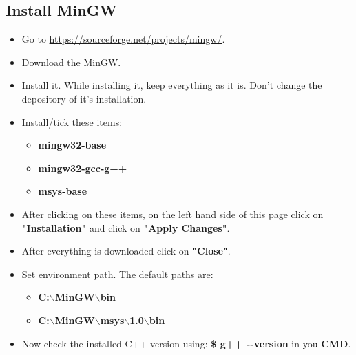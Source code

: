 \documentclass[12pt , a4paper]{article}
\newcommand{\hl}[1]{\colorbox{coolblack}{\color{cream}\textbf{#1}\color{black}}}
\begin{document}
	\subsection{Install MinGW}
		\begin{itemize}
			\item Go to \href{https://sourceforge.net/projects/mingw/}{https://sourceforge.net/projects/mingw/}. \\
			\item Download the MinGW. \\
			\item Install it. While installing it, keep everything as it is. Don't change the depository of it's installation.\\
			\item Install/tick these items:\\
				\begin{itemize}
					\item \hl{mingw32-base} \\
					\item \hl{mingw32-gcc-g++}\\
					\item \hl{msys-base}\\
				\end{itemize}
			\item After clicking on these items, on the left hand side of this page click on \hl{"Installation"} and click on \hl{"Apply Changes"}.\\
			\item After everything is downloaded click on \hl{"Close"}.\\
			\item Set environment path. The default paths are: \\
				\begin{itemize}
					\item  \hl{C:$\backslash$MinGW$\backslash$bin} \\
					\item  \hl{C:$\backslash$MinGW$\backslash$msys$\backslash$1.0$\backslash$bin} \\
				\end{itemize}
			\item Now check the installed C++ version using: \hl{\$ g++  -\--version} in you \hl{CMD}.\\
		\end{itemize}
\end{document}
